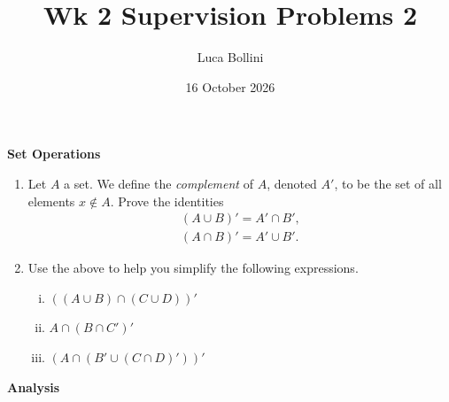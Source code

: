 \documentclass{article}
\title{Wk 2 Supervision Problems 2}
\author{Luca Bollini}
\date{16 October 2026}
\begin{document}
\maketitle

\begin{center}
\huge{\textbf{Set Operations}} 
\end{center}

\begin{enumerate}
    \item Let $A$ a set. We define the \emph{complement} of $A$, denoted $A'$, to be the set of all elements $x \notin A$.
    Prove the identities
    \begin{gather*}
        (A \cup B)' = A' \cap B',\\
        (A \cap B)' = A' \cup B'.
    \end{gather*}
    \item Use the above to help you simplify the following expressions.
    \begin{enumerate}[(i)]
        \item $((A \cup B) \cap (C \cup D))'$
        \item $A \cap (B \cap C')'$
        \item $(A \cap (B' \cup (C\cap D)'))'$
    \end{enumerate}
\end{enumerate}


\begin{center}
\huge{\textbf{Analysis}}
\end{center}
\end{document}
